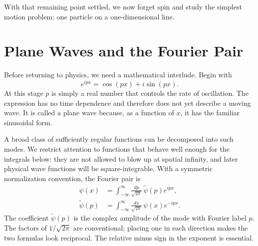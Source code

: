 \begin{classroomqa}
\end{classroomqa}

With that remaining point settled, we now forget spin and study the simplest motion problem: one particle on a one-dimensional line.

\section{Plane Waves and the Fourier Pair}

Before returning to physics, we need a mathematical interlude. Begin with
\begin{equation}
e^{ipx}=\cos(px)+i\sin(px).
\end{equation}
At this stage \(p\) is simply a real number that controls the rate of oscillation. The expression has no time dependence and therefore does not yet describe a moving wave. It is called a plane wave because, as a function of \(x\), it has the familiar sinusoidal form.

A broad class of sufficiently regular functions can be decomposed into such modes. We restrict attention to functions that behave well enough for the integrals below: they are not allowed to blow up at spatial infinity, and later physical wave functions will be square-integrable. With a symmetric normalization convention, the Fourier pair is
\begin{align}
\psi(x)
&=
\int_{-\infty}^{\infty}
\frac{dp}{\sqrt{2\pi}}\,
\widetilde{\psi}(p)e^{ipx},
\label{eq:l9-fourier-forward}\\
\widetilde{\psi}(p)
&=
\int_{-\infty}^{\infty}
\frac{dx}{\sqrt{2\pi}}\,
\psi(x)e^{-ipx}.
\label{eq:l9-fourier-inverse}
\end{align}
The coefficient \(\widetilde{\psi}(p)\) is the complex amplitude of the mode with Fourier label \(p\). The factors of \(1/\sqrt{2\pi}\) are conventional; placing one in each direction makes the two formulas look reciprocal. The relative minus sign in the exponent is essential.

